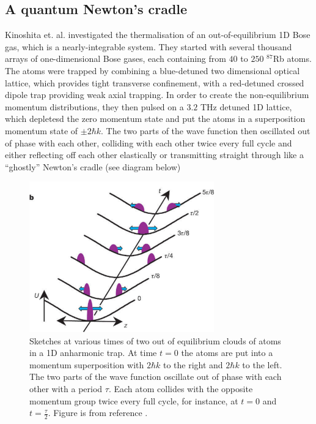 \documentclass[a4paper,10pt]{article}
\theoremstyle{plain}
\begin{document}
\subsection{A quantum Newton's cradle}
Kinoshita et. al. investigated \cite{Kinoshita2006} the thermalisation of an 
out-of-equilibrium 1D Bose gas, which is a  nearly-integrable system. They 
started with several thousand arrays of one-dimensional Bose gases, each 
containing from $40$ to $250$ $^{87}$Rb atoms. The atoms were trapped by 
combining a blue-detuned  two dimensional optical lattice, which provides 
tight transverse confinement, with a red-detuned crossed dipole trap 
providing weak axial trapping. In order 
to create the non-equilibrium momentum distributions, they then pulsed on a 
$3.2$ THz detuned 1D lattice, which depletesd the zero momentum state
and put the atoms in a superposition momentum state of $\pm2\hbar k$. The two 
parts of the wave function then oscillated out of phase with each other, 
colliding with each other twice every full cycle and either reflecting off 
each other elastically or transmitting straight through like a ``ghostly'' 
Newton's cradle (see diagram below)

\begin{figure}[H]
 \begin{center}
 \includegraphics[width=8cm]{quantum_newtons_cradle}
 \end{center}
 \caption{Sketches at various times of two out of equilibrium
clouds of atoms in a 1D anharmonic trap. At time $t=0$ the atoms are put into 
a momentum superposition with $2\hbar k$ to the right and $2\hbar k$ to the 
left. The two parts of the wave function oscillate out of phase with each other 
with a period $\tau$. Each atom collides with the opposite momentum group
twice every full cycle, for instance, at $t=0$ and $t=\frac{\tau}{2}$. Figure 
is from reference \cite{Kinoshita2006}.}
 \end{figure}
\end{document}
